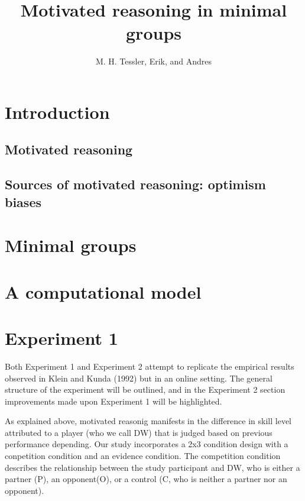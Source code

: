 \documentclass{article} \usepackage{apacite} \usepackage{graphicx} \usepackage{listings}
\begin{document}
 \title{Motivated reasoning in minimal groups}
\author{M. H. Tessler, Erik, and Andres} \renewcommand{\today}{Psych 241\\June 8,
2014} \maketitle

\section{Introduction}

\subsection{Motivated reasoning}

\subsection{Sources of motivated reasoning: optimism biases}

\section{Minimal groups}

\section{A computational model}

\section{Experiment 1}

Both Experiment 1 and Experiment 2 attempt to replicate the empirical results observed in Klein and Kunda (1992) but in an online setting. The general structure of the experiment will be outlined, and in the Experiment 2 section improvements made upon Experiment 1 will be highlighted.

As explained above, motivated reasonig manifests in the difference in skill level attributed to a player (who we call DW) that is judged based on previous performance depending. Our study incorporates a 2x3 condition design with a conpetition condition and an evidence condition. The competition condition describes the relationship between the study participant and DW, who is either a partner (P), an opponent(O), or a control (C, who is neither a partner nor an opponent). 
\end{document}
